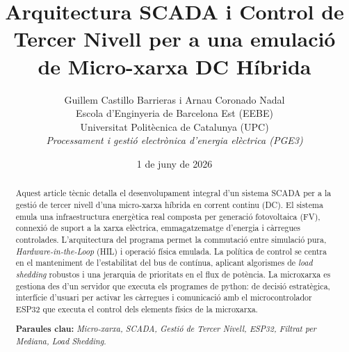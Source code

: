 \documentclass[11pt,a4paper]{article}
\title{\fontsize{16pt}{20pt}\selectfont \textbf{Arquitectura SCADA i Control de Tercer Nivell per a una emulació de Micro-xarxa DC Híbrida}}
\author{
    Guillem Castillo Barrieras i Arnau Coronado Nadal \\
    \small Escola d'Enginyeria de Barcelona Est (EEBE) \\
    \small Universitat Politècnica de Catalunya (UPC) \\
    \small \textit{Processament i gestió electrònica d'energia elèctrica (PGE3)}
}
\date{1 de juny de 2026}
\begin{document}
\maketitle

\begin{abstract}
    Aquest article tècnic detalla el desenvolupament integral d'un sistema SCADA per a la gestió de tercer nivell d'una micro-xarxa híbrida en corrent continu (DC). El sistema emula una infraestructura energètica real composta per generació fotovoltaica (FV), connexió de suport a la xarxa elèctrica, emmagatzematge d'energia i càrregues controlades. L'arquitectura del programa permet la commutació entre simulació pura, \textit{Hardware-in-the-Loop} (HIL) i operació física emulada. La política de control se centra en el manteniment de l'estabilitat del bus de contínua, aplicant algorismes de \textit{load shedding} robustos i una jerarquia de prioritats en el flux de potència. La microxarxa es gestiona des d'un servidor que executa els programes de python: de decisió estratègica, interfície d'usuari per activar les càrregues i comunicació amb el microcontrolador ESP32 que executa el control dels elements físics de la microxarxa.
    \vspace{0.2cm}

    \textbf{Paraules clau:} \textit{Micro-xarxa, SCADA, Gestió de Tercer Nivell, ESP32, Filtrat per Mediana, Load Shedding.}
\end{abstract}

\tableofcontents
\newpage
\end{document}
